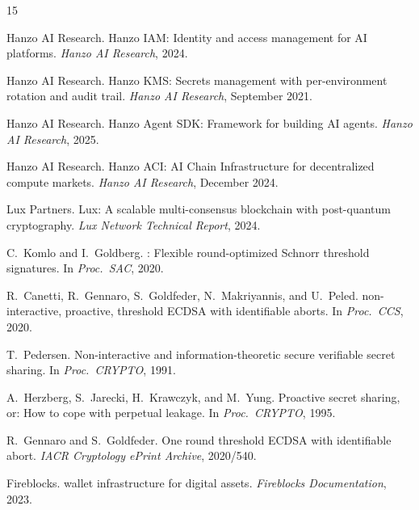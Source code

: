 \documentclass[11pt]{article}
\begin{document}
\begin{thebibliography}{15}

{Hanzo AI Research}.
\newblock Hanzo {IAM}: Identity and access management for {AI} platforms.
\newblock \emph{Hanzo AI Research}, 2024.

{Hanzo AI Research}.
\newblock Hanzo {KMS}: Secrets management with per-environment rotation and audit trail.
\newblock \emph{Hanzo AI Research}, September 2021.

{Hanzo AI Research}.
\newblock Hanzo Agent {SDK}: Framework for building {AI} agents.
\newblock \emph{Hanzo AI Research}, 2025.

{Hanzo AI Research}.
\newblock Hanzo {ACI}: {AI} Chain Infrastructure for decentralized compute markets.
\newblock \emph{Hanzo AI Research}, December 2024.

{Lux Partners}.
\newblock Lux: A scalable multi-consensus blockchain with post-quantum cryptography.
\newblock \emph{Lux Network Technical Report}, 2024.

C.~Komlo and I.~Goldberg.
: Flexible round-optimized {Schnorr} threshold signatures.
\newblock In \emph{Proc.\ SAC}, 2020.

R.~Canetti, R.~Gennaro, S.~Goldfeder, N.~Makriyannis, and U.~Peled.
 non-interactive, proactive, threshold {ECDSA} with identifiable aborts.
\newblock In \emph{Proc.\ CCS}, 2020.

T.~Pedersen.
\newblock Non-interactive and information-theoretic secure verifiable secret sharing.
\newblock In \emph{Proc.\ CRYPTO}, 1991.

A.~Herzberg, S.~Jarecki, H.~Krawczyk, and M.~Yung.
\newblock Proactive secret sharing, or: How to cope with perpetual leakage.
\newblock In \emph{Proc.\ CRYPTO}, 1995.

R.~Gennaro and S.~Goldfeder.
\newblock One round threshold {ECDSA} with identifiable abort.
\newblock \emph{IACR Cryptology ePrint Archive}, 2020/540.

{Fireblocks}.
 wallet infrastructure for digital assets.
\newblock \emph{Fireblocks Documentation}, 2023.

\end{thebibliography}
\end{document}
